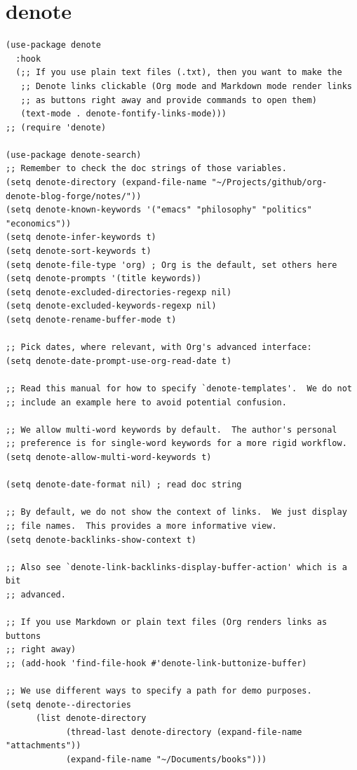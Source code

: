 \documentclass[11pt]{article}
\begin{document}
\section{denote}
\label{sec:orgfbdb00e}
\begin{verbatim}
(use-package denote
  :hook
  (;; If you use plain text files (.txt), then you want to make the
   ;; Denote links clickable (Org mode and Markdown mode render links
   ;; as buttons right away and provide commands to open them)
   (text-mode . denote-fontify-links-mode)))
;; (require 'denote)

(use-package denote-search)
;; Remember to check the doc strings of those variables.
(setq denote-directory (expand-file-name "~/Projects/github/org-denote-blog-forge/notes/"))
(setq denote-known-keywords '("emacs" "philosophy" "politics" "economics"))
(setq denote-infer-keywords t)
(setq denote-sort-keywords t)
(setq denote-file-type 'org) ; Org is the default, set others here
(setq denote-prompts '(title keywords))
(setq denote-excluded-directories-regexp nil)
(setq denote-excluded-keywords-regexp nil)
(setq denote-rename-buffer-mode t)

;; Pick dates, where relevant, with Org's advanced interface:
(setq denote-date-prompt-use-org-read-date t)

;; Read this manual for how to specify `denote-templates'.  We do not
;; include an example here to avoid potential confusion.

;; We allow multi-word keywords by default.  The author's personal
;; preference is for single-word keywords for a more rigid workflow.
(setq denote-allow-multi-word-keywords t)

(setq denote-date-format nil) ; read doc string

;; By default, we do not show the context of links.  We just display
;; file names.  This provides a more informative view.
(setq denote-backlinks-show-context t)

;; Also see `denote-link-backlinks-display-buffer-action' which is a bit
;; advanced.

;; If you use Markdown or plain text files (Org renders links as buttons
;; right away)
;; (add-hook 'find-file-hook #'denote-link-buttonize-buffer)

;; We use different ways to specify a path for demo purposes.
(setq denote--directories
      (list denote-directory
            (thread-last denote-directory (expand-file-name "attachments"))
            (expand-file-name "~/Documents/books")))


\end{verbatim}
\end{document}
